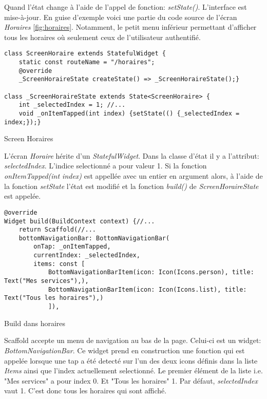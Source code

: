     Quand l'état change à l'aide de l'appel de fonction: \textit{setState()}. L'interface est mise-à-jour. En guise d'exemple voici une partie du code source
    de l'écran \textit{Horaires} \ref{fig:horaires}. Notamment, le petit menu inférieur permettant d'afficher tous les horaires où seulement ceux de l'utilisateur
    authentifié.
    \begin{listing}[h]
        \begin{verbatim}
class ScreenHoraire extends StatefulWidget {
    static const routeName = "/horaires";
    @override
    _ScreenHoraireState createState() => _ScreenHoraireState();}

class _ScreenHoraireState extends State<ScreenHoraire> {
    int _selectedIndex = 1; //...
    void _onItemTapped(int index) {setState(() {_selectedIndex = index;});}
        \end{verbatim}
    \caption{Screen Horaires}
    \label{code:screenHoraires}
    \end{listing}
    
    L'écran \textit{Horaire} hérite d'un \textit{StatefulWidget}. Dans la classe d'état il y a l'attribut: \textit{selectedIndex}. L'indice selectionné a pour valeur 1. 
    Si la fonction \textit{onItemTapped(int index)} est appellée avec un entier en argument alors, à l'aide de la fonction \textit{setState} l'état est modifié
    et la fonction \textit{build()} de \textit{ScreenHoraireState} est appelée.

    \begin{listing}[h]
        \begin{verbatim}
@override
Widget build(BuildContext context) {//...
    return Scaffold(//...
    bottomNavigationBar: BottomNavigationBar(
        onTap: _onItemTapped,
        currentIndex: _selectedIndex,
        items: const [
            BottomNavigationBarItem(icon: Icon(Icons.person), title: Text("Mes services"),),
            BottomNavigationBarItem(icon: Icon(Icons.list), title: Text("Tous les horaires"),)
            ]),
        \end{verbatim}
    \caption{Build dans horaires}
    \label{code:buildHoraire}
    \end{listing}

    Scaffold accepte un menu de navigation au bas de la page. Celui-ci est un widget: \textit{BottomNavigationBar}. Ce widget prend en construction
    une fonction qui est appelée lorsque une tap a été detecté sur l'un des deux icons définis dans la liste \textit{Items} ainsi que l'index actuellement 
    selectionné. Le premier élément de la liste i.e. "Mes services" a pour index 0. Et "Tous les horaires" 1. Par défaut, \textit{selectedIndex} vaut 1. C'est donc tous les 
    horaires qui sont affiché.
    
